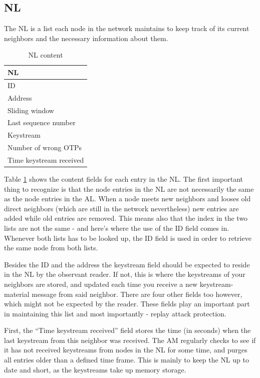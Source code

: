 \subsection{\acl{NL}}
The \acf{NL} is a list each node in the network maintains to keep track of its
current neighbors and the necessary information about them.
\begin{table}[h]
	\centering
	\begin{tabular}{| l |}\hline
 		\textbf{\acl{NL}}\\\hline
		ID\\\hline
		Address\\\hline
		Sliding window\\\hline 
		Last sequence number\\\hline 
		Keystream\\\hline
		Number of wrong OTPs\\\hline
		Time keystream received\\\hline
	\end{tabular}
	\caption{\acf{NL} content}
	\label{tab:nl_content}
\end{table}
Table \ref{tab:nl_content} shows the content fields for each entry in the
\ac{NL}. The first important thing to recognize is that the node entries in the
\ac{NL} are not necessarily the same as the node entries in the \ac{AL}. When a
node meets new neighbors and looses old direct neighbors (which are still in
the network nevertheless) new entries are added while old entries are removed.
This means also that the index in the two lists are not the same - and here's
where the use of the ID field comes in. Whenever both lists has to be looked up,
the ID field is used in order to retrieve the same node from both lists.

Besides the ID and the address the keystream field should be expected to reside
in the \ac{NL} by the observant reader. If not, this is where the keystreams of
your neighbors are stored, and updated each time you receive a new
keystream-material message from said neighbor. There are four other fields too
however, which might not be expected by the reader. These fields play an
important part in maintaining this list and most importantly - replay attack
protection.

First, the ``Time keystream received'' field stores the time (in seconds) when
the last keystream from this neighbor was received. The \acl{AM} regularly
checks to see if it has not received keystreams from nodes in the \ac{NL} for
some time, and purges all entries older than a defined time frame. This is
mainly to keep the \ac{NL} up to date and short, as the keystreams take up memory
storage.

